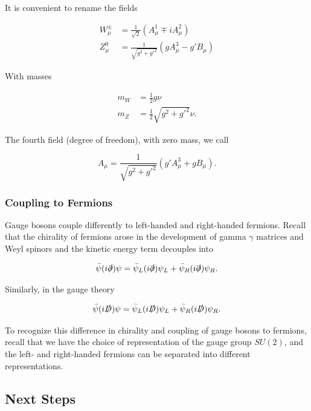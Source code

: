 \noindent It is convenient to rename the fields

\begin{align}
W_\mu^\pm &= \frac{1}{\sqrt{2}} \left( A_\mu^1 \mp i A_\mu^2 \right) \\
Z_\mu^0 &= \frac{1}{\sqrt{g^2 + g'^2}} \left( g A_\mu^3 - g' B_\mu \right)
\end{align}

\noindent With masses

\begin{align}
m_W &= \frac{1}{2} g \nu \\
m_Z &= \frac{1}{2} \sqrt{g^2 + g'^2} \nu.
\end{align}

\noindent The fourth field (degree of freedom), with zero mass, we call

\begin{equation}
A_\mu = \frac{1}{\sqrt{g^2 + g'^2}} (g' A_\mu^3 + g B_\mu ).
\end{equation}

\subsubsection*{Coupling to Fermions}

\noindent Gauge bosons couple differently to left-handed and right-handed fermions. Recall that the chirality of fermions arose in the development of gamma $\gamma$ matrices and Weyl spinors and the kinetic energy term decouples into

\begin{equation}
\bar{\psi} (i \slashed{\partial}) \psi = \bar{\psi}_L (i \slashed{\partial}) \psi_L + \bar{\psi}_R (i \slashed{\partial}) \psi_R.
\end{equation}

\noindent Similarly, in the gauge theory

\begin{equation}
\bar{\psi} (i \slashed{D}) \psi = \bar{\psi}_L (i \slashed{D}) \psi_L + \bar{\psi}_R (i \slashed{D}) \psi_R.
\end{equation}

\noindent To recognize this difference in chirality and coupling of gauge bosons to fermions, recall that we have the choice of representation of the gauge group $SU(2)$, and the left- and right-handed fermions can be separated into different representations.

\clearpage

\subsection*{Next Steps}

